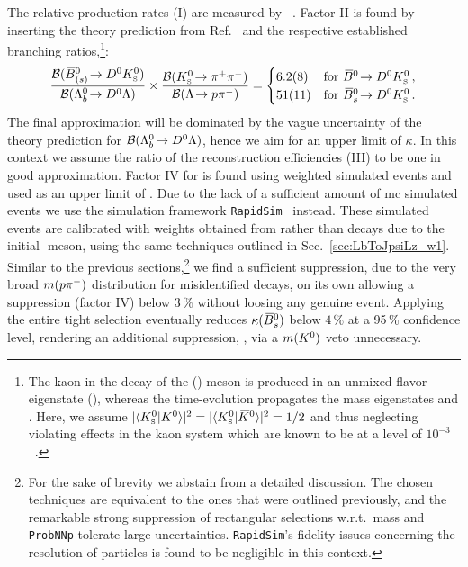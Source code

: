 The relative production rates (I) are measured by \lhcb~\cite{LHCb_bProdFrac_7,LHCb_bProdFrac_13}.
Factor II is found by inserting the theory prediction from Ref.~\cite{brLbToDzLz_pred} and the respective established branching ratios,\footnote{The kaon in the decay of the \Bd (\Bs) meson is produced in an unmixed flavor eigenstate \Kzb (\Kz), whereas the time-evolution propagates the mass eigenstates \KL and \KS. Here, we assume $|\langle {\ensuremath{{K}^0_{\mathrm{ \scriptscriptstyle S}}}} | {{K}^0} \rangle|^2 = |\langle {\ensuremath{{K}^0_{\mathrm{ \scriptscriptstyle S}}}} | {{\kern 0.2em\overline{\kern -0.2em K}{}}{}^0} \rangle|^2 = 1/2$ and thus neglecting \CP{} violating effects in the kaon system which are known to be at a level of $10^{-3}$~\cite{pdg}.}:
\begin{equation*}
    \frac{\mathcal{B}(\decay{\Bbar{}^0_{(\squark)}}{\Dz\KS})}{\mathcal{B}(\decay{\Lb}{\Dz\Lz})} \times \frac{\mathcal{B}(\decay{\KS}{\pip\pim})}{\mathcal{B}(\decay{\Lz}{\proton\pim})} =
    \begin{cases}
        6.2(8) & \text{for } \decay{\Bdb}{\Dz\KS} \,, \\
        51(11) & \text{for } \decay{\Bsb}{\Dz\KS} \,.
    \end{cases}
\end{equation*}
The final approximation will be dominated by the vague uncertainty of the theory prediction for $\mathcal{B}({{\Lambda}^0_{b}}\!\rightarrow {\ensuremath{{D}^0}}{\ensuremath{\Lambda}})$, hence we aim for an upper limit of $\kappa$.
In this context we assume the ratio of the reconstruction efficiencies (III) to be one in good approximation.
Factor IV for \decay{\Bsb}{\Dz\KS} is found using weighted simulated events and used as an upper limit of \decay{\Bdb}{\Dz\KS}.
Due to the lack of a sufficient amount of \gls{mc} simulated events we use the simulation framework \texttt{RapidSim}~\cite{rapidsim} instead.
These simulated events are calibrated with weights obtained from \decay{\Bd}{\jpsi\KS} rather than \decay{\Lb}{\jpsi\Lz} decays due to the initial \bquark-meson, using the same techniques outlined in Sec.~\ref{sec:LbToJpsiLz_w1}.
Similar to the previous sections,\footnote{For the sake of brevity we abstain from a detailed discussion. The chosen techniques are equivalent to the ones that were outlined previously, and the remarkable strong suppression of rectangular selections w.r.t.\ mass and \texttt{ProbNNp} tolerate large uncertainties. \texttt{RapidSim}'s fidelity issues concerning the resolution of \KS particles is found to be negligible in this context.} we find a sufficient suppression, due to the very broad $m({p}{{\pi}^-})$ distribution for misidentified \decay{\KS}{\pip\pim} decays, on its own allowing a suppression (factor IV) below $3\,\%$ without loosing any genuine \decay{\Lz}{\proton\pim} event.
Applying the entire \decay{\Lb}{\Dz\Lz} tight selection eventually reduces $\kappa({{\kern 0.18em\overline{\kern -0.18em B}{}}{}^0_{s}})$ below $4\,\%$ at a 95\,\% confidence level, rendering an additional suppression, \eg{}, via a $m({{K}^0})$ veto unnecessary.
